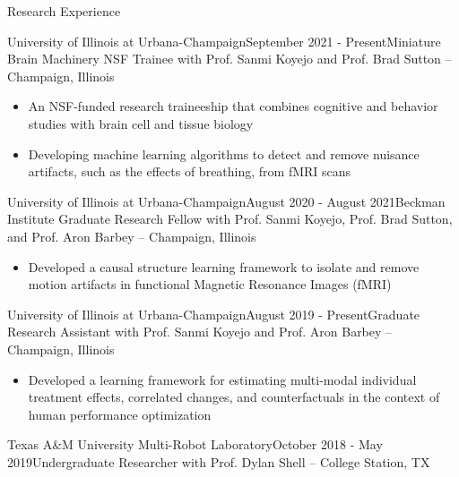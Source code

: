 \documentclass{resume} %
\begin{document}

\begin{rSection}{Research Experience}
\begin{rSubsection}{University of Illinois at Urbana-Champaign}{September 2021 - Present}{Miniature Brain Machinery NSF Trainee with Prof. Sanmi Koyejo and Prof. Brad Sutton -- Champaign, Illinois} 

\begin{itemize}
    \setlength\itemsep{0em}
    \item An NSF-funded research traineeship that combines cognitive and behavior studies with brain cell and tissue biology
    \item Developing machine learning algorithms to detect and remove nuisance artifacts, such as the effects of breathing, from fMRI scans
\end{itemize}
\end{rSubsection}
\begin{rSubsection}{University of Illinois at Urbana-Champaign}{August 2020 - August 2021}{Beckman Institute Graduate Research Fellow with Prof. Sanmi Koyejo, Prof. Brad Sutton, and Prof. Aron Barbey -- Champaign, Illinois} 

\begin{itemize}
    \setlength\itemsep{0em}
    \item Developed a causal structure learning framework to isolate and remove motion artifacts in functional Magnetic Resonance Images (fMRI)
\end{itemize}
\end{rSubsection}
\begin{rSubsection}{University of Illinois at Urbana-Champaign}{August 2019 - Present}{Graduate Research Assistant with Prof. Sanmi Koyejo and Prof. Aron Barbey -- Champaign, Illinois} 

\begin{itemize}
    \setlength\itemsep{0em}
    \item Developed a learning framework for estimating multi-modal individual treatment effects, correlated changes, and counterfactuals in the context of human performance optimization
\end{itemize}
\end{rSubsection}
\begin{rSubsection}{Texas A\&M University Multi-Robot Laboratory}{October 2018 - May 2019}{Undergraduate Researcher with Prof. Dylan Shell -- College Station, TX}


\end{rSubsection}
\end{rSection}
\end{document}
